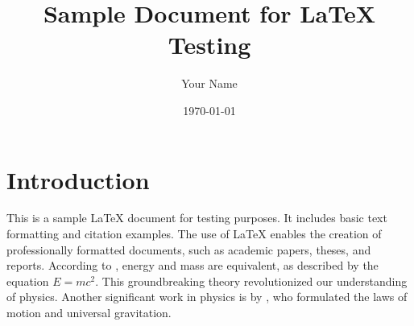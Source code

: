 \documentclass{article}
\begin{document}
\title{Sample Document for LaTeX Testing}
\author{Your Name}
\date{\today}

\maketitle

\section{Introduction}
This is a sample LaTeX document for testing purposes.
It includes basic text formatting and citation examples.
The use of LaTeX enables the creation of professionally formatted documents, such as academic papers, theses, and reports.
According to \citet{Einstein}, energy and mass are equivalent, as described by the equation \(E=mc^2\).
This groundbreaking theory revolutionized our understanding of physics.
Another significant work in physics is by \citet{Newton}, who formulated the laws of motion and universal gravitation.



\end{document}
